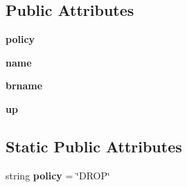 \subsection*{Public Attributes}
\begin{DoxyCompactItemize}
\item 
\hypertarget{classcore_1_1netns_1_1vnet_1_1_lx_br_net_a360defcd405b31705c1151baf04be14a}{{\bfseries policy}}\label{classcore_1_1netns_1_1vnet_1_1_lx_br_net_a360defcd405b31705c1151baf04be14a}

\item 
\hypertarget{classcore_1_1netns_1_1vnet_1_1_lx_br_net_ab5445148132a956309affc12ff83729b}{{\bfseries name}}\label{classcore_1_1netns_1_1vnet_1_1_lx_br_net_ab5445148132a956309affc12ff83729b}

\item 
\hypertarget{classcore_1_1netns_1_1vnet_1_1_lx_br_net_a353ae8ef9f3267886e44a4e7da7607cb}{{\bfseries brname}}\label{classcore_1_1netns_1_1vnet_1_1_lx_br_net_a353ae8ef9f3267886e44a4e7da7607cb}

\item 
\hypertarget{classcore_1_1netns_1_1vnet_1_1_lx_br_net_af3b438548832db35e699415baa36b51a}{{\bfseries up}}\label{classcore_1_1netns_1_1vnet_1_1_lx_br_net_af3b438548832db35e699415baa36b51a}

\end{DoxyCompactItemize}
\subsection*{Static Public Attributes}
\begin{DoxyCompactItemize}
\item 
\hypertarget{classcore_1_1netns_1_1vnet_1_1_lx_br_net_aa51d6152ef84a6394ba33a0f1db83610}{string {\bfseries policy} = \char`\"{}D\+R\+O\+P\char`\"{}}\label{classcore_1_1netns_1_1vnet_1_1_lx_br_net_aa51d6152ef84a6394ba33a0f1db83610}

\end{DoxyCompactItemize}


